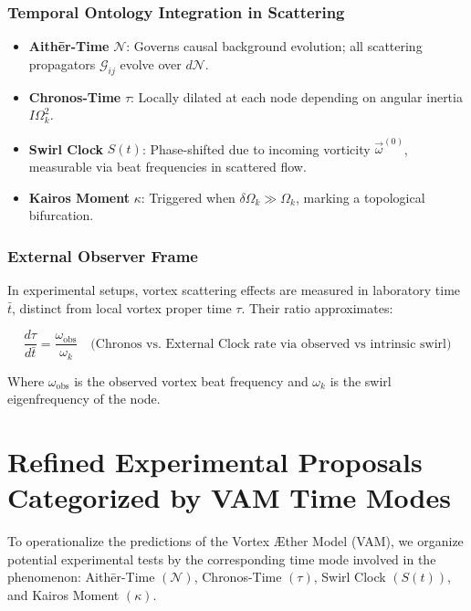 \documentclass[preprint]{revtex4-2}
\begin{document}
\subsubsection*{Temporal Ontology Integration in Scattering}

\begin{itemize}
    \item \textbf{Aithēr-Time} \( \mathcal{N} \): Governs causal background evolution; all scattering propagators \( \mathcal{G}_{ij} \) evolve over \( d\mathcal{N} \).
    \item \textbf{Chronos-Time} \( \tau \): Locally dilated at each node depending on angular inertia \( I \Omega_k^2 \).
    \item \textbf{Swirl Clock} \( S(t) \): Phase-shifted due to incoming vorticity \( \vec{\omega}^{(0)} \), measurable via beat frequencies in scattered flow.
    \item \textbf{Kairos Moment} \( \kappa \): Triggered when \(\delta \Omega_k \gg \Omega_k\), marking a topological bifurcation.
\end{itemize}

\subsubsection*{External Observer Frame}

In experimental setups, vortex scattering effects are measured in laboratory time \( \bar{t} \), distinct from local vortex proper time \( \tau \). Their ratio approximates:

\[
    \frac{d\tau}{d\bar{t}} = \frac{\omega_{\text{obs}}}{\omega_k} \quad \text{(Chronos vs. External Clock rate via observed vs intrinsic swirl)}

\]

Where \( \omega_{\text{obs}} \) is the observed vortex beat frequency and \( \omega_k \) is the swirl eigenfrequency of the node.

\section{Refined Experimental Proposals Categorized by VAM Time Modes}

To operationalize the predictions of the Vortex \AE ther Model (VAM), we organize potential experimental tests by the corresponding time mode involved in the phenomenon: Aith\=er-Time \((\mathcal{N})\), Chronos-Time \((\tau)\), Swirl Clock \((S(t))\), and Kairos Moment \((\kappa)\).
\end{document}
